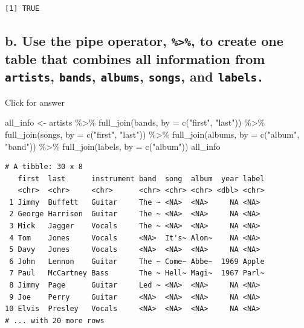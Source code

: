 \documentclass[
]{book}
\newenvironment{Shaded}{\begin{snugshade}}{\end{snugshade}}
\newcommand{\AttributeTok}[1]{\textcolor[rgb]{0.77,0.63,0.00}{#1}}
\newcommand{\FunctionTok}[1]{\textcolor[rgb]{0.00,0.00,0.00}{#1}}
\newcommand{\NormalTok}[1]{#1}
\newcommand{\OtherTok}[1]{\textcolor[rgb]{0.56,0.35,0.01}{#1}}
\newcommand{\SpecialCharTok}[1]{\textcolor[rgb]{0.00,0.00,0.00}{#1}}
\newcommand{\StringTok}[1]{\textcolor[rgb]{0.31,0.60,0.02}{#1}}
\begin{document}
\begin{verbatim}
[1] TRUE
\end{verbatim}

\hypertarget{b.-use-the-pipe-operator-to-create-one-table-that-combines-all-information-from-artists-bands-albums-songs-and-labels.}{%
\subsection{\texorpdfstring{b. Use the pipe operator, \texttt{\%\textgreater{}\%}, to create one table that combines all information from \texttt{artists}, \texttt{bands}, \texttt{albums}, \texttt{songs}, and \texttt{labels.}}{b. Use the pipe operator, \%\textgreater\%, to create one table that combines all information from artists, bands, albums, songs, and labels.}}\label{b.-use-the-pipe-operator-to-create-one-table-that-combines-all-information-from-artists-bands-albums-songs-and-labels.}}

Click for answer

\begin{Shaded}
\begin{Highlighting}[]
\NormalTok{all\_info }\OtherTok{\textless{}{-}}\NormalTok{ artists }\SpecialCharTok{\%\textgreater{}\%} 
  \FunctionTok{full\_join}\NormalTok{(bands, }\AttributeTok{by =} \FunctionTok{c}\NormalTok{(}\StringTok{"first"}\NormalTok{, }\StringTok{"last"}\NormalTok{)) }\SpecialCharTok{\%\textgreater{}\%} 
  \FunctionTok{full\_join}\NormalTok{(songs, }\AttributeTok{by =} \FunctionTok{c}\NormalTok{(}\StringTok{"first"}\NormalTok{, }\StringTok{"last"}\NormalTok{)) }\SpecialCharTok{\%\textgreater{}\%} 
  \FunctionTok{full\_join}\NormalTok{(albums, }\AttributeTok{by =} \FunctionTok{c}\NormalTok{(}\StringTok{"album"}\NormalTok{, }\StringTok{"band"}\NormalTok{)) }\SpecialCharTok{\%\textgreater{}\%}
  \FunctionTok{full\_join}\NormalTok{(labels, }\AttributeTok{by =} \FunctionTok{c}\NormalTok{(}\StringTok{"album"}\NormalTok{))}
\NormalTok{all\_info}
\end{Highlighting}
\end{Shaded}

\begin{verbatim}
# A tibble: 30 x 8
   first  last      instrument band  song  album  year label
   <chr>  <chr>     <chr>      <chr> <chr> <chr> <dbl> <chr>
 1 Jimmy  Buffett   Guitar     The ~ <NA>  <NA>     NA <NA> 
 2 George Harrison  Guitar     The ~ <NA>  <NA>     NA <NA> 
 3 Mick   Jagger    Vocals     The ~ <NA>  <NA>     NA <NA> 
 4 Tom    Jones     Vocals     <NA>  It's~ Alon~    NA <NA> 
 5 Davy   Jones     Vocals     <NA>  <NA>  <NA>     NA <NA> 
 6 John   Lennon    Guitar     The ~ Come~ Abbe~  1969 Apple
 7 Paul   McCartney Bass       The ~ Hell~ Magi~  1967 Parl~
 8 Jimmy  Page      Guitar     Led ~ <NA>  <NA>     NA <NA> 
 9 Joe    Perry     Guitar     <NA>  <NA>  <NA>     NA <NA> 
10 Elvis  Presley   Vocals     <NA>  <NA>  <NA>     NA <NA> 
# ... with 20 more rows
\end{verbatim}
\end{document}
